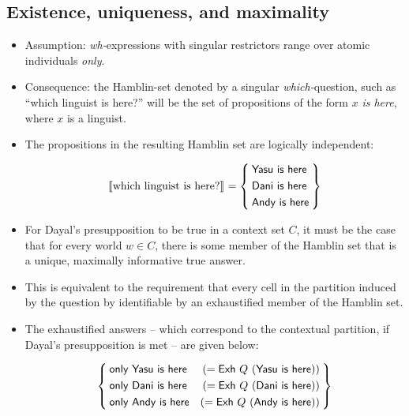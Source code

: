 \documentclass[portrait,cronos,paper=letter]{ling-handout}
\begin{document}
    \subsection{Existence, uniqueness, and maximality}

    \begin{itemize}

        \item Assumption: \textit{wh-}expressions with singular restrictors
        range over atomic individuals \textit{only}.

        \item Consequence: the Hamblin-set denoted by a singular
        \textit{which-}question, such as \enquote{which linguist is here?} will
        be the set of propositions of the form $x$ \textit{is here}, where $x$
        is a linguist.

        \item The propositions in the resulting Hamblin set are logically independent:

        \[
        \eval{which linguist is here?} = \Set{\begin{aligned}[c]
            &\ml{Yasu is here}\\
            &\ml{Dani is here}\\
            &\ml{Andy is here}
          \end{aligned}}
        \]

        \item For Dayal's presupposition to be true in a context set $C$, it
        must be the case that for every world $w ∈ C$, there is some member of
        the Hamblin set that is a unique, maximally informative true answer.

        \item This is equivalent to the requirement that every cell in the
        partition induced by the question by identifiable by an exhaustified
        member of the Hamblin set.

        \item The exhaustified answers -- which correspond to the contextual
        partition, if Dayal's presupposition is met -- are given below:

        \[
        \Set{
        \begin{aligned}[c]
          &\ml{only Yasu is here}&(= \ml{Exh} Q (\ml{Yasu is here}))\\
          &\ml{only Dani is here}&(= \ml{Exh} Q (\ml{Dani is here}))\\
          &\ml{only Andy is here}&(= \ml{Exh} Q (\ml{Andy is here}))
        \end{aligned}
        }
        \]


\end{itemize}
\end{document}
